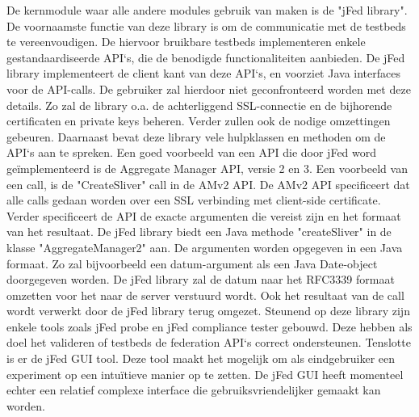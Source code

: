 \npar
De kernmodule waar alle andere modules gebruik van maken is de "jFed library". De voornaamste functie van deze library is om de communicatie met de testbeds te vereenvoudigen. De hiervoor bruikbare testbeds implementeren enkele gestandaardiseerde API\lq s, die de benodigde functionaliteiten aanbieden. De jFed library implementeert de client kant van deze API\lq s, en voorziet Java interfaces voor de API-calls. De gebruiker zal hierdoor niet geconfronteerd worden met deze details. Zo zal de library o.a. de achterliggend SSL-connectie en de bijhorende certificaten en private keys beheren. Verder zullen ook de nodige omzettingen gebeuren. Daarnaast bevat deze library vele hulpklassen en methoden om de API\lq s aan te spreken.
\npar
Een goed voorbeeld van een API die door jFed word ge\"implementeerd is de Aggregate Manager API, versie 2 en 3.  Een voorbeeld van een call, is de "CreateSliver" call in de AMv2 API.
De AMv2 API specificeert dat alle calls gedaan worden over een SSL verbinding met client-side certificate. Verder specificeert de API de exacte argumenten die vereist zijn en het formaat van het resultaat. De jFed library biedt een Java methode "createSliver" in de klasse "AggregateManager2" aan. De argumenten worden opgegeven in een Java formaat. Zo zal bijvoorbeeld een datum-argument als een Java Date-object doorgegeven worden.  De jFed library zal de datum naar het RFC3339 formaat omzetten voor het naar de server verstuurd wordt. Ook het resultaat van de call wordt verwerkt door de jFed library terug omgezet.
\npar
Steunend op deze library zijn enkele tools zoals jFed probe en jFed compliance tester gebouwd. Deze hebben als doel het valideren of testbeds de federation API\lq s correct ondersteunen. Tenslotte is er de jFed GUI tool. Deze tool maakt het mogelijk om als eindgebruiker een experiment op een intu\"itieve manier op te zetten. De jFed GUI heeft momenteel echter een relatief complexe interface die gebruiksvriendelijker gemaakt kan worden. 

